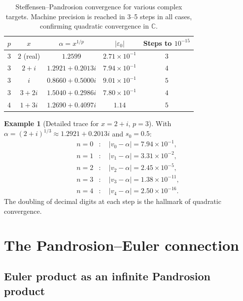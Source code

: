 \documentclass[10pt,a4paper,oneside]{book}
\theoremstyle{definition}
\newtheorem{example}[theorem]{Example}
\theoremstyle{remark}
\newcommand{\CC}{\mathbb{C}}
\newcommand{\eps}{\varepsilon}
\begin{document}
\begin{table}[h]
\centering
\begin{tabular}{ccccc}
\toprule
$p$ & $x$ & $\alpha = x^{1/p}$ & $|\eps_0|$ & Steps to $10^{-15}$ \\
\midrule
$3$ & $2$ (real) & $1.2599$ & $2.71 \times 10^{-1}$ & $3$ \\
$3$ & $2+i$ & $1.2921 + 0.2013i$ & $7.94 \times 10^{-1}$ & $4$ \\
$3$ & $i$ & $0.8660 + 0.5000i$ & $9.01 \times 10^{-1}$ & $5$ \\
$3$ & $3+2i$ & $1.5040 + 0.2986i$ & $7.80 \times 10^{-1}$ & $4$ \\
$4$ & $1+3i$ & $1.2690 + 0.4097i$ & $1.14$ & $5$ \\
\bottomrule
\end{tabular}
\caption{Steffensen--Pandrosion convergence for various complex targets.  Machine precision is reached in 3--5 steps in all cases, confirming quadratic convergence in $\CC$.}
\label{tab:steffensen_complex}
\end{table}

\begin{example}[Detailed trace for $x = 2+i$, $p = 3$]
With $\alpha = (2+i)^{1/3} \approx 1.2921 + 0.2013i$ and $s_0 = 0.5$:
\begin{align*}
  n=0&: \quad |v_0 - \alpha| = 7.94 \times 10^{-1}, \\
  n=1&: \quad |v_1 - \alpha| = 3.31 \times 10^{-2}, \\
  n=2&: \quad |v_2 - \alpha| = 2.45 \times 10^{-5}, \\
  n=3&: \quad |v_3 - \alpha| = 1.38 \times 10^{-11}, \\
  n=4&: \quad |v_4 - \alpha| = 2.50 \times 10^{-16}.
\end{align*}
The doubling of decimal digits at each step is the hallmark of quadratic convergence.
\end{example}

\section{The Pandrosion--Euler connection}
\label{sec:euler}

\subsection{Euler product as an infinite Pandrosion product}
\end{document}
